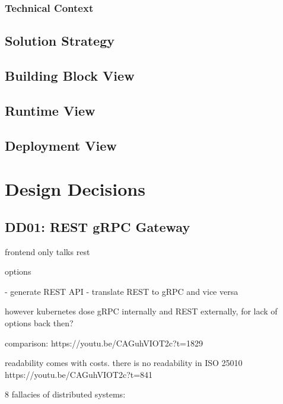 
\subsubsection{Technical Context}

\subsection{Solution Strategy}

\subsection{Building Block View}

\subsection{Runtime View}

\subsection{Deployment View}

\section{Design Decisions}

\subsection{DD01: REST gRPC Gateway}

frontend only talks rest

options

- generate REST API
- translate REST to gRPC and vice versa


however kubernetes dose gRPC internally and REST externally, for lack of options back then?


comparison: https://youtu.be/CAGuhVIOT2c?t=1829


readability comes with costs. there is no readability in ISO 25010
https://youtu.be/CAGuhVIOT2c?t=841

8 fallacies of distributed systems:

